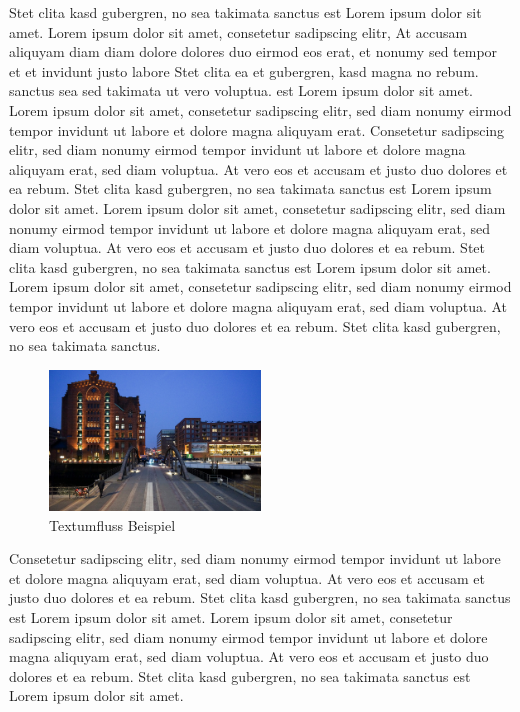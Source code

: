 	Stet clita kasd gubergren, no sea takimata sanctus est Lorem ipsum dolor sit amet. Lorem ipsum dolor sit amet, consetetur sadipscing elitr, At accusam aliquyam diam diam dolore dolores duo eirmod eos erat, et nonumy sed tempor et et invidunt justo labore Stet clita ea et gubergren, kasd magna no rebum. sanctus sea sed takimata ut vero voluptua. est Lorem ipsum dolor sit amet. Lorem ipsum dolor sit amet, consetetur sadipscing elitr, sed diam nonumy eirmod tempor invidunt ut labore et dolore magna aliquyam erat.	Consetetur sadipscing elitr, sed diam nonumy eirmod tempor invidunt ut labore et dolore magna aliquyam erat, sed diam voluptua. At vero eos et accusam et justo duo dolores et ea rebum. Stet clita kasd gubergren, no sea takimata sanctus est Lorem ipsum dolor sit amet. Lorem ipsum dolor sit amet, consetetur sadipscing elitr, sed diam nonumy eirmod tempor invidunt ut labore et dolore magna aliquyam erat, sed diam voluptua. At vero eos et accusam et justo duo dolores et ea rebum. Stet clita kasd gubergren, no sea takimata sanctus est Lorem ipsum dolor sit amet. Lorem ipsum dolor sit amet, consetetur sadipscing elitr, sed diam nonumy eirmod tempor invidunt ut labore et dolore magna aliquyam erat, sed diam voluptua. At vero eos et accusam et justo duo dolores et ea rebum. Stet clita kasd gubergren, no sea takimata sanctus. 
	
	\begin{figure}
		\vspace{-13pt} %
		\includegraphics[width=0.5\textwidth]{images/b3.jpg} %
		\caption{Textumfluss Beispiel}
	\end{figure}

	Consetetur sadipscing elitr, sed diam nonumy eirmod tempor invidunt ut labore et dolore magna aliquyam erat, sed diam voluptua. At vero eos et accusam et justo duo dolores et ea rebum. Stet clita kasd gubergren, no sea takimata sanctus est Lorem ipsum dolor sit amet. Lorem ipsum dolor sit amet, consetetur sadipscing elitr, sed diam nonumy eirmod tempor invidunt ut labore et dolore magna aliquyam erat, sed diam voluptua. At vero eos et accusam et justo duo dolores et ea rebum. Stet clita kasd gubergren, no sea takimata sanctus est Lorem ipsum dolor sit amet. 
		
